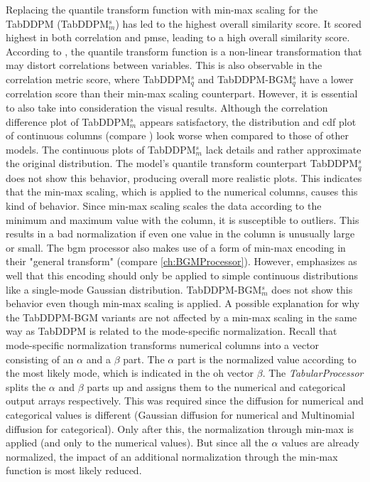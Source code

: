 Replacing the quantile transform function with min-max scaling for the TabDDPM (TabDDPM$^{s}_m$) has led to the highest overall similarity score.
It scored highest in both correlation and \gls{pmse}, leading to a high overall similarity score.
According to \cite{scikit-learndevelopers2023QuantileTransformer}, the quantile transform function is a non-linear transformation that may distort correlations between variables.
This is also observable in the correlation metric score, where TabDDPM$^{s}_q$ and TabDDPM-BGM$^{s}_q$ have a lower correlation score than their min-max scaling counterpart.
However, it is essential to also take into consideration the visual results.
Although the correlation difference plot of TabDDPM$^{s}_m$ appears satisfactory, the distribution and \gls{cdf} plot of continuous columns (compare ) look worse when compared to those of other models.
The continuous plots of TabDDPM$^{s}_m$ lack details and rather approximate the original distribution.
The model's quantile transform counterpart TabDDPM$^{s}_q$ does not show this behavior, producing overall more realistic plots.
This indicates that the min-max scaling, which is applied to the numerical columns, causes this kind of behavior.
Since min-max scaling scales the data according to the minimum and maximum value with the column, it is susceptible to outliers.
This results in a bad normalization if even one value in the column is unusually large or small.
The \gls{bgm} processor also makes use of a form of min-max encoding in their "general transform" \cite[p. 7]{zhao2022CTABGANEnhancingTabular} (compare \autoref{ch:BGMProcessor}).
However, \textcite{zhao2022CTABGANEnhancingTabular} emphasizes as well that this encoding should only be applied to simple continuous distributions like a single-mode Gaussian distribution.
TabDDPM-BGM$^{s}_m$ does not show this behavior even though min-max scaling is applied.
A possible explanation for why the TabDDPM-BGM variants are not affected by a min-max scaling in the same way as TabDDPM is related to the mode-specific normalization.
Recall that mode-specific normalization transforms numerical columns into a vector consisting of an $\alpha$ and a $\beta$ part.
The $\alpha$ part is the normalized value according to the most likely mode, which is indicated in the \gls{oh} vector $\beta$.
The \textit{TabularProcessor} splits the $\alpha$ and $\beta$ parts up and assigns them to the numerical and categorical output arrays respectively.
This was required since the diffusion for numerical and categorical values is different (Gaussian diffusion for numerical and Multinomial diffusion for categorical).
Only after this, the normalization through min-max is applied (and only to the numerical values). 
But since all the $\alpha$ values are already normalized, the impact of an additional normalization through the min-max function is most likely reduced.

